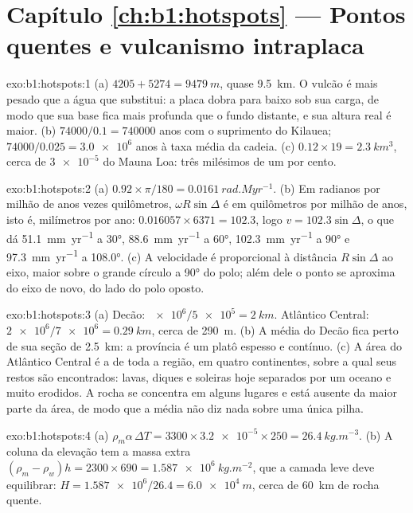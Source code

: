\section*{Capítulo \ref{ch:b1:hotspots} --- Pontos quentes e vulcanismo intraplaca}

\begin{solution}{exo:b1:hotspots:1}
(a) $4205 + 5274 = \qty{9479}{m}$, quase \qty{9.5}{km}. O vulcão é mais pesado que a água que substitui: a placa dobra para baixo sob sua carga, de modo que sua base fica mais profunda que o fundo distante, e sua altura real é maior. (b) $74000/0.1 = \num{740000}$ anos com o suprimento do Kilauea; $74000/0.025 = \num{3.0e6}$ anos à taxa média da cadeia. (c)
$0.12\times19 = \qty{2.3}{km^3}$, cerca de $\num{3e-5}$ do Mauna Loa: três milésimos de um por cento.
\end{solution}

\begin{solution}{exo:b1:hotspots:2}
(a) $0.92\times\pi/180 = \qty{0.0161}{rad.Myr^{-1}}$. (b) Em radianos por milhão de anos vezes quilômetros, $\omega R\sin\Delta$ é em quilômetros por milhão de anos, isto é, milímetros por ano: $0.016057\times6371 = 102.3$, logo $v = 102.3\sin\Delta$, o que dá \qty{51.1}{mm.yr^{-1}} a \ang{30}, \qty{88.6}{mm.yr^{-1}} a \ang{60}, \qty{102.3}{mm.yr^{-1}} a \ang{90} e \qty{97.3}{mm.yr^{-1}} a \ang{108.0}. (c) A velocidade é proporcional à distância $R\sin\Delta$ ao eixo, maior sobre o grande círculo a \ang{90} do polo; além dele o ponto se aproxima do eixo de novo, do lado do polo oposto.
\end{solution}

\begin{solution}{exo:b1:hotspots:3}
(a) Decão: $\num{e6}/\num{5e5} = \qty{2}{km}$. Atlântico Central: $\num{2e6}/\num{7e6} = \qty{0.29}{km}$, cerca de \qty{290}{m}. (b) A média do Decão fica perto de sua seção de \qty{2.5}{km}: a província é um platô espesso e contínuo. (c) A área do Atlântico Central é a de toda a região, em quatro continentes, sobre a qual seus restos são encontrados: lavas, diques e soleiras hoje separados por um oceano e muito erodidos. A rocha se concentra em alguns lugares e está ausente da maior parte da área, de modo que a média não diz nada sobre uma única pilha.
\end{solution}

\begin{solution}{exo:b1:hotspots:4}
(a) $\rho_m\alpha\,\Delta T = 3300\times\num{3.2e-5}\times250 =
\qty{26.4}{kg.m^{-3}}$. (b) A coluna da elevação tem a massa extra $(\rho_m - \rho_w)h = 2300\times690 = \qty{1.587e6}{kg.m^{-2}}$, que a camada leve deve equilibrar: $H = \num{1.587e6}/26.4 = \qty{6.0e4}{m}$, cerca de \qty{60}{km} de rocha quente.
\end{solution}

